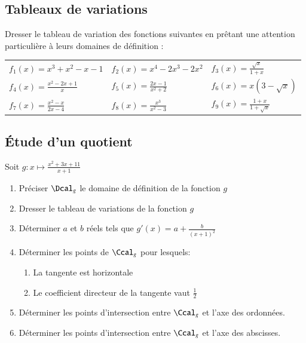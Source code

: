 \documentclass[oneside,12pt]{article}          %
\begin{document}
\subsection{Tableaux de variations}
 Dresser le tableau de variation des fonctions suivantes en prêtant une attention particulière à leurs domaines de définition : \\
\renewcommand{\arraystretch}{1.4}
\begin{tabular}{p{} p{} p{}}
    $f_1(x)=x^3+x^2-x-1$ & $f_2(x)=x^4-2x^3-2x^2$ & $f_3(x)=\frac{\sqrt{x}}{1+x}$ \\
    $f_4(x)=\frac{x^2-2x+1}{x}$ & $f_5(x)=\frac{2x-1}{x^2+2}$ & $f_6(x)=x(3-\sqrt{x})$ \\
    $f_7(x)=\frac{x^2-x}{2x-4}$ & $f_8(x)=\frac{x^3}{x^2-3}$ & $f_9(x)=\frac{1+x}{1+\sqrt{x}}$
\end{tabular}



\subsection{Étude d'un quotient}
Soit $g:x\mapsto\frac{x^2+3x+11}{x+1}$
\begin{enumerate}
    \item Préciser $\Dcal_g$ le domaine de définition de la fonction $g$
    \item Dresser le tableau de variations de la fonction $g$
    \item Déterminer $a$ et $b$ réels tels que $g'(x)=a+\frac{b}{(x+1)^2}$
    \item Déterminer les points de $\Ccal_g$ pour lesquels:
    \begin{enumerate}
        \item La tangente est horizontale
        \item Le coefficient directeur de la tangente vaut $\frac{1}{2}$
    \end{enumerate}
    \item Déterminer les points d'intersection entre $\Ccal_g$ et l'axe des ordonnées.
    \item Déterminer les points d'intersection entre $\Ccal_g$ et l'axe des abscisses.
\end{enumerate}
\end{document}
